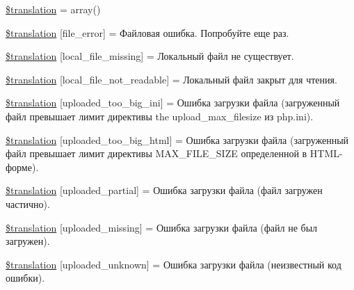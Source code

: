 \begin{DoxyCompactItemize}
\item 
\hyperlink{class_8upload_8ru___r_u_8php_a1f198d410fecc3871ebdd468d343a5e3}{\$translation} = array()
\item 
\hyperlink{class_8upload_8ru___r_u_8php_ac7498e49b9771b04698029aa61c70821}{\$translation} \mbox{[}\textquotesingle{}file\+\_\+error\textquotesingle{}\mbox{]} = \textquotesingle{}Файловая ошибка. Попробуйте еще раз.\textquotesingle{}
\item 
\hyperlink{class_8upload_8ru___r_u_8php_a6ec3d3a47ab70d77e7aa593e82ead10e}{\$translation} \mbox{[}\textquotesingle{}local\+\_\+file\+\_\+missing\textquotesingle{}\mbox{]} = \textquotesingle{}Локальный файл не существует.\textquotesingle{}
\item 
\hyperlink{class_8upload_8ru___r_u_8php_a60104befef9b241f3a7a6a755618a4b3}{\$translation} \mbox{[}\textquotesingle{}local\+\_\+file\+\_\+not\+\_\+readable\textquotesingle{}\mbox{]} = \textquotesingle{}Локальный файл закрыт для чтения.\textquotesingle{}
\item 
\hyperlink{class_8upload_8ru___r_u_8php_a6a08dcd0d3651fdd098568f6b2f0a42c}{\$translation} \mbox{[}\textquotesingle{}uploaded\+\_\+too\+\_\+big\+\_\+ini\textquotesingle{}\mbox{]} = \textquotesingle{}Ошибка загрузки файла (загруженный файл превышает лимит директивы the upload\+\_\+max\+\_\+filesize из php.\+ini).\textquotesingle{}
\item 
\hyperlink{class_8upload_8ru___r_u_8php_a623d5b8b92169f57d7e43458aa911cbb}{\$translation} \mbox{[}\textquotesingle{}uploaded\+\_\+too\+\_\+big\+\_\+html\textquotesingle{}\mbox{]} = \textquotesingle{}Ошибка загрузки файла (загруженный файл превышает лимит директивы M\+A\+X\+\_\+\+F\+I\+L\+E\+\_\+\+S\+I\+Z\+E определенной в H\+T\+M\+L-\/форме).\textquotesingle{}
\item 
\hyperlink{class_8upload_8ru___r_u_8php_a967c17da21b0a2d3bd65cca3a9ca0ea8}{\$translation} \mbox{[}\textquotesingle{}uploaded\+\_\+partial\textquotesingle{}\mbox{]} = \textquotesingle{}Ошибка загрузки файла (файл загружен частично).\textquotesingle{}
\item 
\hyperlink{class_8upload_8ru___r_u_8php_a0cce433260be65f1f35853a6b4b8952b}{\$translation} \mbox{[}\textquotesingle{}uploaded\+\_\+missing\textquotesingle{}\mbox{]} = \textquotesingle{}Ошибка загрузки файла (файл не был загружен).\textquotesingle{}
\item 
\hyperlink{class_8upload_8ru___r_u_8php_a4a9168e922b827e6a28b5db1c00774ca}{\$translation} \mbox{[}\textquotesingle{}uploaded\+\_\+unknown\textquotesingle{}\mbox{]} = \textquotesingle{}Ошибка загрузки файла (неизвестный код ошибки).\textquotesingle{}

\end{DoxyCompactItemize}
